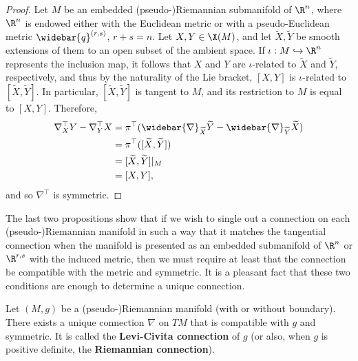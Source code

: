 \begin{proof}
Let $M$ be an embedded (pseudo-)Riemannian submanifold of $\R^n$, where $\R^n$ is endowed either with the Euclidean metric or with a pseudo-Euclidean metric 
$\widebar{q}^{(r,s)}$, $r+s=n$. Let $X,Y\in\X(M)$, and let $\widetilde{X},\widetilde{Y}$ be smooth extensions of them to an open subset of the ambient space. If 
$\iota:M\hookrightarrow\R^n$ represents the inclusion map, it follows that $X$ and $Y$ are $\iota$-related to $\widetilde{X}$ and $\widetilde{Y}$, respectively, and thus 
by the naturality of the Lie bracket, $[X,Y]$ is $\iota$-related to $[\widetilde{X},\widetilde{Y}]$. In particular, $[\widetilde{X},\widetilde{Y}]$ is tangent to $M$, 
and its restriction to $M$ is equal to $[X,Y]$. Therefore,
\begin{align*}
\nabla^{\top}_XY-\nabla^{\top}_YX&=\pi^{\top}(\widebar{\nabla}_{\widetilde{X}}\widetilde{Y}-\widebar{\nabla}_{\widetilde{Y}}\widetilde{X})\\
&=\pi^{\top}([\widetilde{X},\widetilde{Y}])\\
&=[\widetilde{X},\widetilde{Y}]|_M\\
&=[X,Y],
\end{align*}
and so $\nabla^{\top}$ is symmetric.
\end{proof}
The last two propositions show that if we wish to single out a connection on each (pseudo-)Riemannian manifold in such a way that it matches the tangential 
connection when the manifold is presented as an embedded submanifold of $\R^n$ or $\R^{r,s}$ with the induced metric, then we must require at least that the connection 
be compatible with the metric and symmetric. It is a pleasant fact that these two conditions are enough to determine a unique connection.
\begin{theorem}
Let $(M,g)$ be a (pseudo-)Riemannian manifold (with or without boundary). There exists a unique connection $\nabla$ on $TM$ that is compatible with $g$ and symmetric. It is called the \textbf{Levi-Civita connection} of $g$ (or also, when $g$ is positive definite, the \textbf{Riemannian connection}).
\end{theorem}
